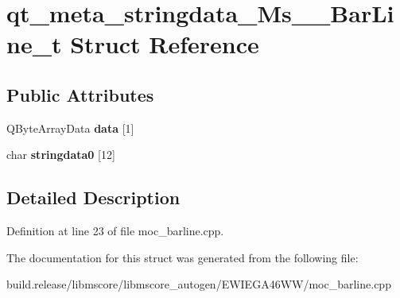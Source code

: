 \hypertarget{structqt__meta__stringdata___ms_____bar_line__t}{}\section{qt\+\_\+meta\+\_\+stringdata\+\_\+\+Ms\+\_\+\+\_\+\+Bar\+Line\+\_\+t Struct Reference}
\label{structqt__meta__stringdata___ms_____bar_line__t}
\subsection*{Public Attributes}
\begin{DoxyCompactItemize}
\item 
\mbox{\label{structqt__meta__stringdata___ms_____bar_line__t_af4331c527db23a1e1f1ee3efd6ef00cd}} 
Q\+Byte\+Array\+Data {\bfseries data} \mbox{[}1\mbox{]}
\item 
\mbox{\label{structqt__meta__stringdata___ms_____bar_line__t_ad1db6092d482bc9736cb11ef38d64549}} 
char {\bfseries stringdata0} \mbox{[}12\mbox{]}
\end{DoxyCompactItemize}


\subsection{Detailed Description}


Definition at line 23 of file moc\+\_\+barline.\+cpp.



The documentation for this struct was generated from the following file\+:\begin{DoxyCompactItemize}
\item 
build.\+release/libmscore/libmscore\+\_\+autogen/\+E\+W\+I\+E\+G\+A46\+W\+W/moc\+\_\+barline.\+cpp\end{DoxyCompactItemize}
